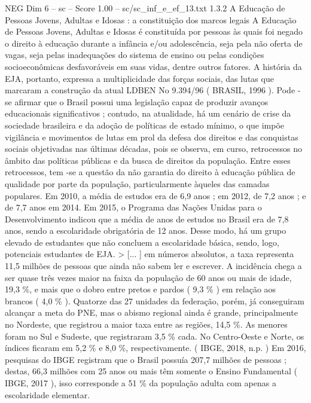 \begin{textsample}{NEG Dim 6 – sc – Score 1.00 – sc/sc\_inf\_e\_ef\_13.txt}  \label{ex:f6_neg_274}
1.3.2 A Educação de Pessoas Jovens, Adultas e Idosas : a constituição dos marcos legais A Educação de Pessoas Jovens, Adultas e Idosas é constituída por pessoas às quais foi negado o direito à educação durante a infância e/ou adolescência, seja pela não oferta de vagas, seja pelas inadequações do sistema de ensino ou pelas condições socioeconômicas desfavoráveis em suas vidas, dentre outros fatores.
A história da EJA, portanto, expressa a multiplicidade das forças sociais, das lutas que marcaram a construção da atual LDBEN No 9.394/96 ( BRASIL, 1996 ).
Pode -se afirmar que o Brasil possui uma legislação capaz de produzir avanços educacionais significativos ; contudo, na atualidade, há um cenário de crise da sociedade brasileira e da adoção de políticas de estado mínimo, o que impõe vigilância e movimentos de lutas em prol da defesa dos direitos e das conquistas sociais objetivadas nas últimas décadas, pois se observa, em curso, retrocessos no âmbito das políticas públicas e da busca de direitos da população.
Entre esses retrocessos, tem -se a questão da não garantia do direito à educação pública de qualidade por parte da população, particularmente àqueles das camadas populares.
Em 2010, a média de estudos era de 6,9 anos ; em 2012, de 7,2 anos ; e de 7,7 anos em 2014.
Em 2015, o Programa das Nações Unidas para o Desenvolvimento indicou que a média de anos de estudos no Brasil era de 7,8 anos, sendo a escolaridade obrigatória de 12 anos.
Desse modo, há um grupo elevado de estudantes que não concluem a escolaridade básica, sendo, logo, potenciais estudantes de EJA. > [... ] em números absolutos, a taxa representa 11,5 milhões de pessoas que ainda não sabem ler e escrever.
A incidência chega a ser quase três vezes maior na faixa da população de 60 anos ou mais de idade, 19,3 \%, e mais que o dobro entre pretos e pardos ( 9,3 \% ) em relação aos brancos ( 4,0 \% ).
Quatorze das 27 unidades da federação, porém, já conseguiram alcançar a meta do PNE, mas o abismo regional ainda é grande, principalmente no Nordeste, que registrou a maior taxa entre as regiões, 14,5 \%.
As menores foram no Sul e Sudeste, que registraram 3,5 \% cada.
No Centro-Oeste e Norte, os índices ficaram em 5,2 \% e 8,0 \%, respectivamente. ( IBGE, 2018, n.p. ) Em 2016, pesquisas do IBGE registram que o Brasil possuía 207,7 milhões de pessoas ; destas, 66,3 milhões com 25 anos ou mais têm somente o Ensino Fundamental ( IBGE, 2017 ), isso corresponde a 51 \% da população adulta com apenas a escolaridade elementar.

\end{textsample}
